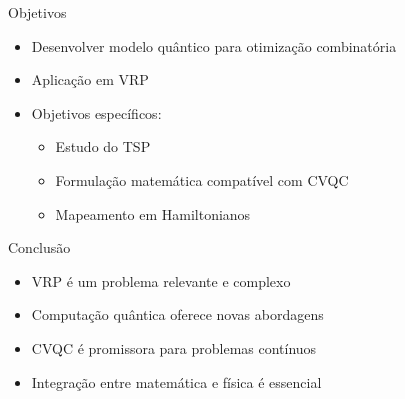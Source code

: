\documentclass{beamer}
\begin{document}

\begin{frame}{Objetivos}
\begin{itemize}
    \item Desenvolver modelo quântico para otimização combinatória
    \item Aplicação em VRP
    \item Objetivos específicos:
    \begin{itemize}
        \item Estudo do TSP
        \item Formulação matemática compatível com CVQC
        \item Mapeamento em Hamiltonianos
    \end{itemize}
\end{itemize}
\end{frame}


\begin{frame}{Conclusão}
\begin{itemize}
    \item VRP é um problema relevante e complexo
    \item Computação quântica oferece novas abordagens
    \item CVQC é promissora para problemas contínuos
    \item Integração entre matemática e física é essencial
\end{itemize}
\end{frame}

\end{document}

